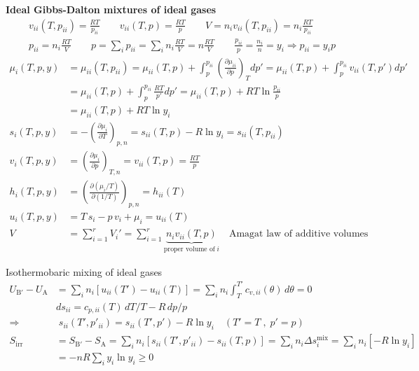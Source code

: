 \begin{example}
    \textbf{Ideal Gibbs-Dalton mixtures of ideal gases}
    \begin{gather*}
        v_{ii}(T, p_{ii}) = \frac{RT}{p_{ii}} \qquad
        v_{ii}(T, p) = \frac{RT}{p} \qquad
        V = n_i v_{ii}(T, p_{ii}) = n_i \frac{RT}{p_{ii}}\\
        p_{ii} = n_i \frac{RT}{V} \qquad
        p = \sum_i p_{ii} = \sum_i n_i \frac{RT}{V} = n \frac{RT}{V} \qquad
        \frac{p_{ii}}{p} = \frac{n_i}{n} = y_i \Rightarrow p_{ii} = y_i p
        \end{gather*}        
        \begin{align*}
        \mu_i(T, p, y) &= \mu_{ii}(T, p_{ii}) 
        = \mu_{ii}(T, p) + \int_p^{p_{ii}} 
        \left( \frac{\partial \mu_{ii}}{\partial p} \right)_T dp' 
        = \mu_{ii}(T, p) + \int_p^{p_{ii}} v_{ii}(T, p') dp' \\
        &= \mu_{ii}(T, p) + \int_p^{p_{ii}} \frac{RT}{p'} dp' 
        = \mu_{ii}(T, p) + RT \ln \frac{p_{ii}}{p} \\
        &= \mu_{ii}(T, p) + RT \ln y_i\\
        s_i(T, p, y) &= - \left( \frac{\partial \mu_i}{\partial T} \right)_{p, n} = s_{ii}(T, p) - R \ln y_i = s_{ii}(T, p_{ii}) \\
        v_i(T, p, y) &= \left( \frac{\partial \mu_i}{\partial p} \right)_{T, n} = v_{ii}(T, p) = \frac{RT}{p} \\
        h_i(T, p, y) &= \left( \frac{\partial (\mu_i/T)}{\partial (1/T)} \right)_{p, n} = h_{ii}(T) \\
        u_i(T, p, y) &= T \, s_i - p \, v_i + \mu_i = u_{ii}(T)\\
        V &= \sum_{i=1}^r V_i' 
        =\sum_{i=1}^r \underbrace{ n_i v_{ii}(T, p)}_{\text{proper volume of}\; i } 
        \quad \boxed{\text{Amagat law of additive volumes}}
        \end{align*}
\end{example}
\begin{example}
    Isothermobaric mixing of ideal gases
    \begin{align*}
        U_{\mathrm{B'}} - U_{\mathrm{A}} &= \sum_i n_i [u_{ii}(T') - u_{ii}(T)] 
        = \sum_i n_i \int_T^{T'} c_{v,ii}(\theta) \, d\theta = 0\\
        &ds_{ii} = c_{p,ii}(T) \, dT/T - R \, dp/p \\
        \Rightarrow&\;
        s_{ii}(T', p'_{ii}) = s_{ii}(T', p') - R \ln y_i \quad(T' = T \;,\; p' = p )\\
            S_{\mathrm{irr}} &= S_{\mathrm{B'}} - S_{\mathrm{A}}
            = \sum_i n_i [s_{ii}(T', p'_{ii}) - s_{ii}(T, p)] 
            = \sum_i n_i \Delta s^{\mathrm{mix}}_{i} 
            = \sum_i n_i [-R \ln y_i]\\ 
            &= -nR \sum_i y_i \ln y_i \geq 0
    \end{align*}
\end{example}
